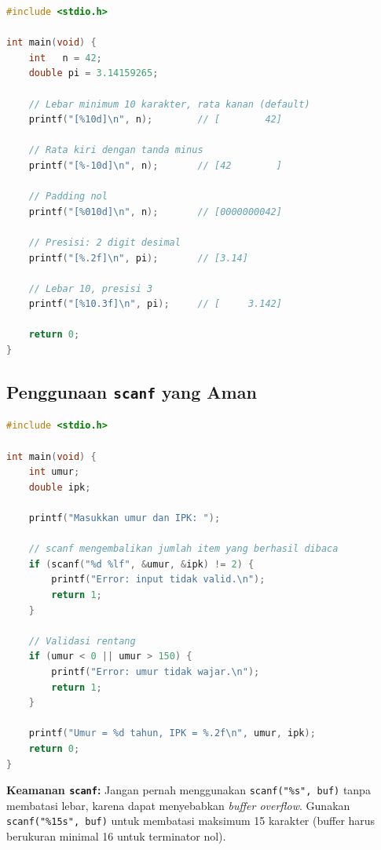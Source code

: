 \documentclass[../main.tex]{subfiles}
\begin{document}
\begin{lstlisting}[language=C,caption=Pengaturan lebar dan presisi output]
#include <stdio.h>

int main(void) {
    int   n = 42;
    double pi = 3.14159265;
    
    // Lebar minimum 10 karakter, rata kanan (default)
    printf("[%10d]\n", n);        // [        42]
    
    // Rata kiri dengan tanda minus
    printf("[%-10d]\n", n);       // [42        ]
    
    // Padding nol
    printf("[%010d]\n", n);       // [0000000042]
    
    // Presisi: 2 digit desimal
    printf("[%.2f]\n", pi);       // [3.14]
    
    // Lebar 10, presisi 3
    printf("[%10.3f]\n", pi);     // [     3.142]
    
    return 0;
}
\end{lstlisting}

\subsection{Penggunaan \texttt{scanf} yang Aman}

\begin{lstlisting}[language=C,caption=Validasi input dengan \texttt{scanf}]
#include <stdio.h>

int main(void) {
    int umur;
    double ipk;
    
    printf("Masukkan umur dan IPK: ");
    
    // scanf mengembalikan jumlah item yang berhasil dibaca
    if (scanf("%d %lf", &umur, &ipk) != 2) {
        printf("Error: input tidak valid.\n");
        return 1;
    }
    
    // Validasi rentang
    if (umur < 0 || umur > 150) {
        printf("Error: umur tidak wajar.\n");
        return 1;
    }
    
    printf("Umur = %d tahun, IPK = %.2f\n", umur, ipk);
    return 0;
}
\end{lstlisting}

\begin{catatan}
\textbf{Keamanan \texttt{scanf}:} Jangan pernah menggunakan \texttt{scanf("\%s", buf)} tanpa membatasi lebar, karena dapat menyebabkan \textit{buffer overflow}. Gunakan \texttt{scanf("\%15s", buf)} untuk membatasi maksimum 15 karakter (buffer harus berukuran minimal 16 untuk terminator nol).
\end{catatan}
\end{document}
